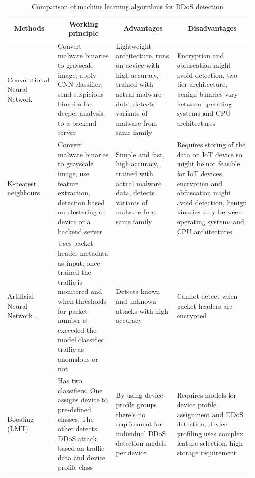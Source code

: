 \documentclass[conference, 11pt]{IEEEtran}
\begin{document}
    \begin{table}[htbp]
        \caption{Comparison of machine learning algorithms for DDoS detection}
        \begin{center}
            \makegapedcells
            \begin{tabularx}{\linewidth}{|l|X|X|X|}
                \hline
                \multicolumn{1}{|c|}{\textbf{Methods}}                              & \multicolumn{1}{|c|}{\textbf{Working principle}}                                                                                                                                                     & \multicolumn{1}{|c|}{\textbf{Advantages}}                                                                                   & \multicolumn{1}{|c|}{\textbf{Disadvantages}} \\
                \hline
                Convolutional Neural Network \cite{article:3}                       & Convert malware binaries to grayscale image, apply CNN classifier, send suspicious binaries for deeper analysis to a backend server & Lightweight architecture, runs on device with high accuracy, trained with actual malware data, detects variants of malware from same family                   & Encryption and obfuscation might avoid detection, two tier-architecture, benign binaries vary between operating systems and CPU architectures                \\
                \hline
                K-nearest neighbours \cite{article:7}                               & Convert malware binaries to grayscale image, use feature extraction, detection based on clustering on device or a backend server & Simple and fast, high accuracy, trained with actual malware data, detects variants of malware from same family                  & Requires storing of the data on IoT device so might be not feasible for IoT devices, encryption and obfuscation might avoid detection, benign binaries vary between operating systems and CPU architectures                      \\
                \hline
                Artificial Neural Network \cite{article:13}, \cite{inproceedings:1} & Uses packet header metadata as input, once trained the traffic is monitored and when thresholds for packet number is exceeded the model classifies traffic as anomalous or not & Detects known and unknown attacks with high accuracy                   & Cannot detect when packet headers are encrypted                      \\
                \hline
                Boosting (LMT) \cite{article:10}                                    & Has two classifiers. One assigns device to pre-defined classes. The other detects DDoS attack based on traffic data and device profile class & By using device profile groups there's no requirement for individual DDoS detection models per device                   & Requires models for device profile assignment and DDoS detection, device profiling uses complex feature selection, high storage requirement                      \\

\end{tabularx}
\end{center}
\end{table}
\end{document}
